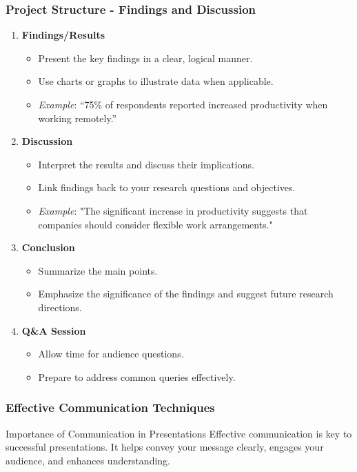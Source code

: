 \documentclass{beamer}
\begin{document}
\begin{frame}[fragile]
    \frametitle{Project Structure - Findings and Discussion}
    \begin{enumerate}[resume]
        \item \textbf{Findings/Results}
            \begin{itemize}
                \item Present the key findings in a clear, logical manner.
                \item Use charts or graphs to illustrate data when applicable.
                \item \textit{Example}: “75\% of respondents reported increased productivity when working remotely.”
            \end{itemize}

        \item \textbf{Discussion}
            \begin{itemize}
                \item Interpret the results and discuss their implications.
                \item Link findings back to your research questions and objectives.
                \item \textit{Example}: "The significant increase in productivity suggests that companies should consider flexible work arrangements."
            \end{itemize}

        \item \textbf{Conclusion}
            \begin{itemize}
                \item Summarize the main points.
                \item Emphasize the significance of the findings and suggest future research directions.
            \end{itemize}

        \item \textbf{Q\&A Session}
            \begin{itemize}
                \item Allow time for audience questions.
                \item Prepare to address common queries effectively.
            \end{itemize}
    \end{enumerate}
\end{frame}

\begin{frame}[fragile]
    \frametitle{Effective Communication Techniques}
    
    \begin{block}{Importance of Communication in Presentations}
        Effective communication is key to successful presentations. It helps convey your message clearly, engages your audience, and enhances understanding.
    \end{block}
\end{frame}
\end{document}
